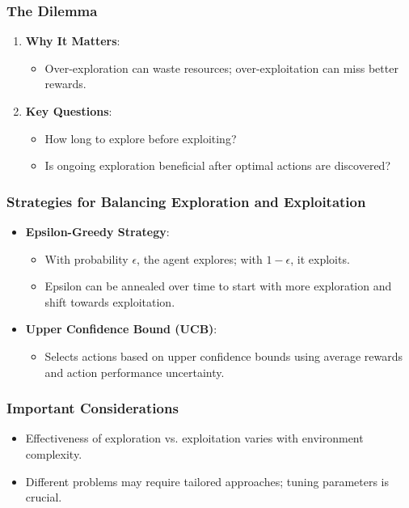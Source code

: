 \documentclass[aspectratio=169]{beamer}
\begin{document}
\begin{frame}[fragile]
    \frametitle{The Dilemma}
    \begin{enumerate}
        \item \textbf{Why It Matters}:
        \begin{itemize}
            \item Over-exploration can waste resources; over-exploitation can miss better rewards.
        \end{itemize}
        \item \textbf{Key Questions}:
        \begin{itemize}
            \item How long to explore before exploiting?
            \item Is ongoing exploration beneficial after optimal actions are discovered?
        \end{itemize}
    \end{enumerate}
\end{frame}

\begin{frame}[fragile]
    \frametitle{Strategies for Balancing Exploration and Exploitation}
    \begin{itemize}
        \item \textbf{Epsilon-Greedy Strategy}:
        \begin{itemize}
            \item With probability $\epsilon$, the agent explores; with $1 - \epsilon$, it exploits.
            \item Epsilon can be annealed over time to start with more exploration and shift towards exploitation.
        \end{itemize}
        \item \textbf{Upper Confidence Bound (UCB)}:
        \begin{itemize}
            \item Selects actions based on upper confidence bounds using average rewards and action performance uncertainty.
        \end{itemize}
    \end{itemize}
\end{frame}

\begin{frame}[fragile]
    \frametitle{Important Considerations}
    \begin{itemize}
        \item Effectiveness of exploration vs. exploitation varies with environment complexity.
        \item Different problems may require tailored approaches; tuning parameters is crucial.
    \end{itemize}
\end{frame}
\end{document}
